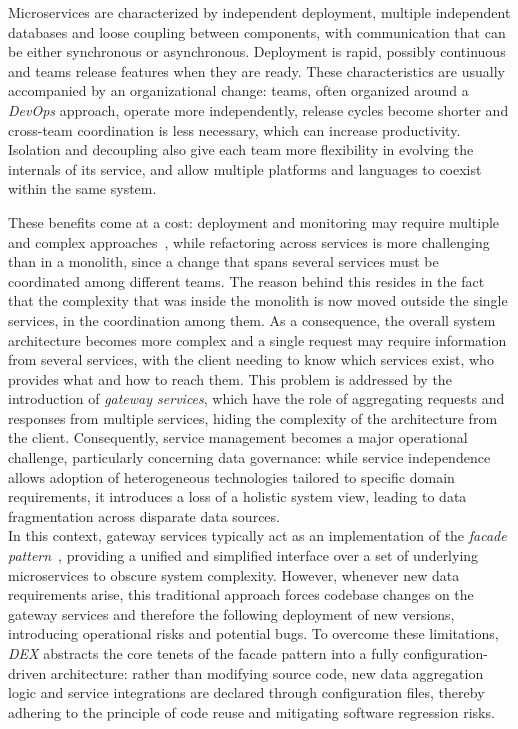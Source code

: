Microservices are characterized by independent deployment, multiple
independent databases and loose coupling between components, with communication
that can be either synchronous or asynchronous. Deployment is rapid, possibly
continuous and teams release features when they are ready. These
characteristics are usually accompanied by an organizational change: teams,
often organized around a \textit{DevOps} approach, operate more independently,
release cycles become shorter and cross-team coordination is less necessary,
which can increase productivity. Isolation and decoupling also give each team
more flexibility in evolving the internals of its service, and allow multiple
platforms and languages to coexist within the same system.

These benefits come at a cost: deployment and monitoring may require multiple
and complex approaches~\cite{faseeha2025observability}, while refactoring across
services is more challenging than in a monolith, since a change that spans
several services must be coordinated among different teams. The reason behind
this resides in the fact that the complexity that was inside the monolith is now
moved outside the single services, in the coordination among them. As a
consequence, the overall system architecture becomes more complex and a single
request may require information from several services, with the client needing
to know which services exist, who provides what and how to reach them. This
problem is addressed by the introduction of \textit{gateway services}, which
have the role of aggregating requests and responses from multiple services,
hiding the complexity of the architecture from the client. Consequently, service
management becomes a major operational challenge, particularly concerning data
governance: while service independence allows adoption of heterogeneous
technologies tailored to specific domain requirements, it introduces a loss of a
holistic system view, leading to data fragmentation across disparate data
sources. \\

In this context, gateway services typically act as an implementation of the
\textit{facade pattern}~\cite{gamma1994design}, providing a unified and
simplified interface over a set of underlying microservices to obscure system
complexity. However, whenever new data requirements arise, this traditional
approach forces codebase changes on the gateway services and therefore the
following deployment of new versions, introducing operational risks and
potential bugs. To overcome these limitations, \textit{DEX} abstracts the core
tenets of the facade pattern into a fully configuration-driven architecture:
rather than modifying source code, new data aggregation logic and service
integrations are declared through configuration files, thereby adhering to the
principle of code reuse and mitigating software regression risks. 

